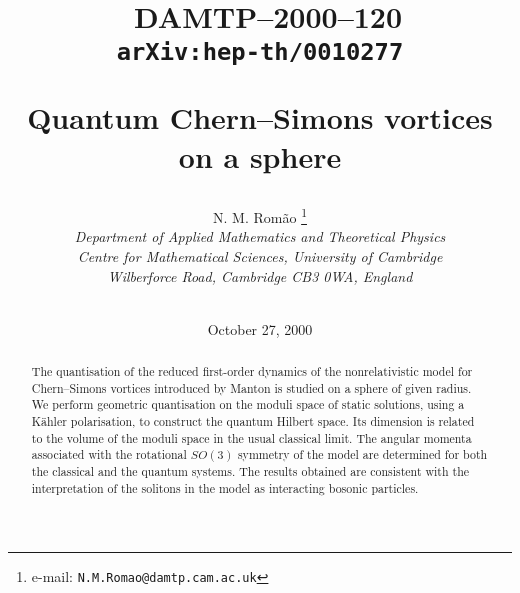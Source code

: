 \documentclass[a4paper,11pt]{article}
\begin{document}
 

\begin{titlepage}

\vspace{2cm}

\title
{\vskip -70pt
\begin{flushright}
{\normalsize \ DAMTP--2000--120\\[-2mm]{\tt arXiv:hep-th/0010277}}\\
\end{flushright}
\vskip 2cm
{\bf Quantum Chern--Simons vortices on a sphere}
\vspace{1.5cm}
}


\author{
{\Large \sc N. M. Rom\~ao}
\thanks{e-mail: {\tt N.M.Romao@damtp.cam.ac.uk}}\\[7mm]
{\normalsize \sl Department of Applied Mathematics and Theoretical Physics}\\
{\normalsize \sl Centre for Mathematical Sciences, University of Cambridge} \\
{\normalsize \sl Wilberforce Road, Cambridge CB3 0WA, England}\\
\\}

\date{October 27, 2000}

\maketitle
\thispagestyle{empty}
\vspace{1cm}

\begin{abstract}

\noindent
The quantisation of the reduced first-order dynamics of the 
nonrelativistic model 
for Chern--Simons vortices introduced by Manton is studied on a sphere
of given radius.
We perform geometric quantisation on the moduli space of static solutions,
using a K\"ahler polarisation, to construct the quantum 
Hilbert space. Its dimension
is related to the volume of the moduli space in the usual classical 
limit.
The angular momenta associated with the rotational $SO(3)$ symmetry of 
the model are determined for both the classical and the quantum
systems. The results obtained are consistent with the interpretation 
of the solitons in the model as interacting bosonic particles.


\end{abstract}

\end{titlepage}
\end{document}
